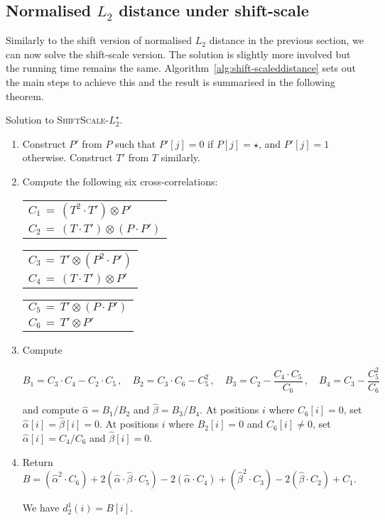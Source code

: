 \documentclass[11pt]{article}
\newcommand{\wildcard}{\ensuremath{\star}\xspace}
\newcommand{\ssLtwoWild}{\textsc{ShiftScale-$L_2^\wildcard$}\xspace}
\newcommand{\DssLtwoWild}{\ensuremath{d_2^{1}}}
\theoremstyle{plain}
\theoremstyle{definition}
\begin{document}
\subsection{Normalised $L_2$ distance under shift-scale}

Similarly to the shift version of normalised $L_2$ distance in the previous section, we can now solve the shift-scale version. The solution is slightly more involved but the running time remains the same. Algorithm~\ref{alg:shift-scaleddistance} sets out the main steps to achieve this and the result is summarised in the following theorem.

\begin{algorithm}[t]
    \caption{Solution to \ssLtwoWild.
    \label{alg:shift-scaleddistance}}
    \begin{enumerate}
        \item Construct $P'$ from $P$ such that $P'[j]=0$ if $P[j]=\wildcard$, and $P'[j]=1$ otherwise. Construct $T'$ from $T$ similarly.
        \item Compute the following six cross-correlations:

        \begin{tabular}{l}
            $C_1 \,=\, (T^2 \cdot T') \otimes P'$ \\
            $C_2 \,=\, (T \cdot T') \otimes (P \cdot P')$
        \end{tabular}
        \hfill
        \begin{tabular}{l}
            $C_3 \,=\, T' \otimes (P^2 \cdot P')$ \\
            $C_4 \,=\, (T \cdot T') \otimes P'$
        \end{tabular}
        \hfill
        \begin{tabular}{l}
            $C_5 \,=\, T' \otimes (P \cdot P')$ \\
            $C_6 \,=\, T'\otimes P'$
        \end{tabular}

        \item Compute

        $B_1 = C_3 \cdot C_4 - C_2 \cdot C_5 \,, \quad
            B_2 = C_3 \cdot C_6 - C_5^2 \,, \quad
            B_3 = C_2 - \dfrac{C_4 \cdot C_5}{C_6} \,, \quad
            B_4 = C_3 - \dfrac{C_5^2}{C_6}$

        and compute $\widehat{\alpha} = B_1/B_2$ and $\widehat{\beta} = B_3/B_4$. At positions $i$ where $C_6[i]=0$, set $\widehat{\alpha}[i]=\widehat{\beta}[i]=0$. At positions $i$ where $B_2[i]=0$ and $C_6[i]\neq 0$, set $\widehat{\alpha}[i]=C_4/C_6$ and $\widehat{\beta}[i]=0$.


        \item Return
            $B = (\widehat{\alpha}^2 \cdot C_6) +
                2 (\widehat{\alpha} \cdot \widehat{\beta} \cdot C_5) -
                2 (\widehat{\alpha} \cdot C_4) +
                (\widehat{\beta}^2 \cdot C_3) -
                2 (\widehat{\beta} \cdot C_2) +
                C_1$.

            We have $\DssLtwoWild(i)=B[i]$.
    \end{enumerate}
    \vspace{-8pt}
\end{algorithm}
\end{document}
